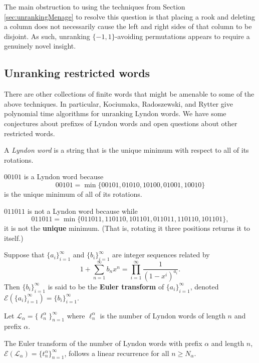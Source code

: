 The main obstruction to using the techniques from
Section \ref{sec:unrankingMenage} to resolve this question is that placing
a rook and deleting a column does not necessarily cause the left and right
sides of that column to be disjoint. As such, unranking $\{-1,1\}$-avoiding
permutations appears to require a genuinely novel insight.

\subsection{Unranking restricted words}
There are other collections of finite words that might be amenable to some of
the above techniques. In particular, Kociumaka, Radoszewski, and Rytter
\cite{Kociumaka2014} give polynomial time algorithms for unranking Lyndon
words. We have some conjectures about prefixes of Lyndon words and open
questions about other restricted words.
\begin{definition}
  A \textit{Lyndon word} is a string that is the unique minimum with respect
  to all of its rotations.
\end{definition}
\begin{example}
  $00101$ is a Lyndon word because \[
    00101 = \min\{00101, 01010, 10100, 01001, 10010\}
  \] is the unique minimum of all of its rotations.

  $011011$ is not a Lyndon word because while \[
    011011 = \min\{011011, 110110, 101101, 011011, 110110, 101101\},
  \]
  it is not the \textbf{unique} minimum.
  (That is, rotating it three positions returns it to itself.)
\end{example}

\begin{definition}
  Suppose that $\{a_i\}_{i=1}^\infty$ and $\{b_i\}_{i=1}^\infty$ are integer sequences
  related by \[
    1 + \sum_{n=1}^\infty b_n x^n = \prod_{i=1}^\infty \frac{1}{(1-x^i)^{a_i}}.
  \] Then $\{b_i\}_{i=1}^\infty$ is said to be the
  \textbf{Euler transform} of $\{a_i\}_{i=1}^\infty$, denoted
  $\mathcal{E}(\{a_i\}_{i=1}^\infty) = \{b_i\}_{i=1}^\infty$.
\end{definition}

\begin{definition}
  Let $\mathcal{L}_\alpha = \{\ell_n^\alpha\}_{n=1}^\infty$ where
  $\ell_n^\alpha$ is the number of Lyndon words of length $n$ and prefix
  $\alpha$.
\end{definition}

\begin{conjecture}
  The Euler transform of the number of Lyndon words with prefix $\alpha$ and
  length $n$,
  $\mathcal{E}(\mathcal{L_\alpha}) = \{t_{n}^\alpha\}_{n=1}^\infty$,
  follows a linear recurrence for all $n \geq N_\alpha$.
\end{conjecture}

